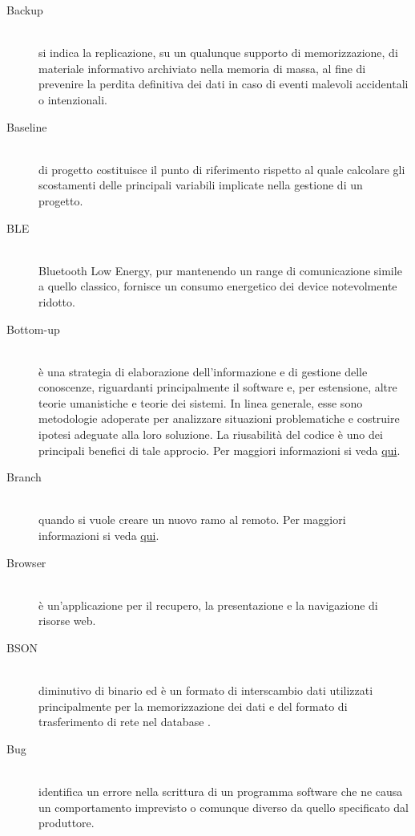 \documentclass[12pt,a4paper]{article}
\begin{document}
\begin{description}
\item[Backup]
\hfill\\si indica la replicazione, su un qualunque supporto di memorizzazione, di materiale informativo archiviato nella memoria di massa, al fine di prevenire la perdita definitiva dei dati in caso di eventi malevoli accidentali o intenzionali.

\item[Baseline]
\hfill\\ di progetto costituisce il punto di riferimento rispetto al quale calcolare gli scostamenti delle principali variabili implicate nella gestione di un progetto.

\item[BLE]
\hfill\\ Bluetooth Low Energy,  pur mantenendo un range di comunicazione simile a quello classico, fornisce un  consumo energetico dei device notevolmente ridotto.

\item[Bottom-up]
\hfill\\è una strategia di elaborazione dell'informazione e di gestione delle conoscenze, riguardanti principalmente il software e, per estensione, altre teorie umanistiche e teorie dei sistemi. In linea generale, esse sono metodologie adoperate per analizzare situazioni problematiche e costruire ipotesi adeguate alla loro soluzione. La riusabilità del codice è uno dei principali benefici di tale approcio. Per maggiori informazioni si veda \href{https://it.wikipedia.org/wiki/Progettazione_top-down_e_bottom-up}{qui}.

\item[Branch]
\hfill\\ quando si vuole creare un nuovo ramo al  remoto. Per maggiori informazioni si veda \href{https://git-scm.com/docs/}{qui}.

\item[Browser]
\hfill\\ è un'applicazione per il recupero, la presentazione e la navigazione di risorse web.

\item[BSON]
\hfill\\ diminutivo di  binario ed è un formato di interscambio dati utilizzati principalmente per la memorizzazione dei dati e del formato di trasferimento di rete nel database .

\item[Bug]
\hfill\\ identifica un errore nella scrittura di un programma software che ne causa un comportamento imprevisto o comunque diverso da quello specificato dal produttore.
\end{description}
\end{document}
